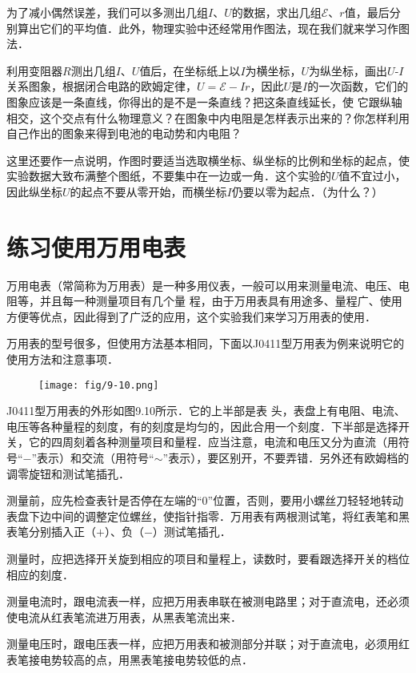为了减小偶然误差，我们可以多测出几组$I$、$U$的数据，求出几组$\mathcal{E}$、$r$值，最后分别算出它们的平均值．此外，物理实验中还经常用作图法，现在我们就来学习作图法．

利用变阻器$R$测出几组$I$、$U$值后，在坐标纸上以$I$为横坐标，$U$为纵坐标，画出$U$-$I$关系图象，根据闭合电路的欧姆定律，$U=\mathcal{E}-Ir$，因此$U$是$I$的一次函数，它们的图象应该是一条直线，你得出的是不是一条直线？把这条直线延长，使
它跟纵轴相交，这个交点有什么物理意义？在图象中内电阻是怎样表示出来的？你怎样利用自己作出的图象来得到电池的电动势和内电阻？

这里还要作一点说明，作图时要适当选取横坐标、纵坐标的比例和坐标的起点，使实验数据大致布满整个图纸，不要集中在一边或一角．这个实验的$U$值不宜过小，因此纵坐标$U$的起点不要从零开始，而横坐标$I$仍要以零为起点．（为什么？）

\section{练习使用万用电表}
万用电表（常简称为万用表）是一种多用仪表，一般可以用来测量电流、电压、电阻等，并且每一种测量项目有几个量
程，由于万用表具有用途多、量程广、使用方便等优点，因此得到了广泛的应用，这个实验我们来学习万用表的使用．

万用表的型号很多，但使用方法基本相同，下面以J0411型万用表为例来说明它的使用方法和注意事项．
\begin{figure}[htp]\centering
    \texttt{[image: fig/9-10.png]}
    \caption{}
    \end{figure}

J0411型万用表的外形如图9.10所示．它的上半部是表
头，表盘上有电阻、电流、电压等各种量程的刻度，有的刻度是均匀的，因此合用一个刻度．下半部是选择开关，它的四周刻着各种测量项目和量程．应当注意，电流和电压又分为直流（用符号“$-$”表示）和交流（用符号“$\sim$”表示），要区别开，不要弄错．另外还有欧姆档的调零旋钮和测试笔插孔．

测量前，应先检查表针是否停在左端的“0”位置，否则，要用小螺丝刀轻轻地转动表盘下边中间的调整定位螺丝，使指针指零．万用表有两根测试笔，将红表笔和黑表笔分别插入正（$+$）、负（$-$）测试笔插孔．

测量时，应把选择开关旋到相应的项目和量程上，读数时，要看跟选择开关的档位相应的刻度．

测量电流时，跟电流表一样，应把万用表串联在被测电路里；对于直流电，还必须使电流从红表笔流进万用表，从黑表笔流出来．

测量电压时，跟电压表一样，应把万用表和被测部分并联；对于直流电，必须用红表笔接电势较高的点，用黑表笔接电势较低的点．

